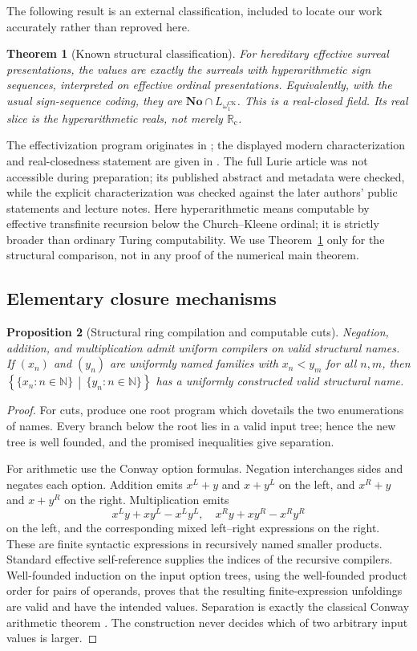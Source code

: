 \documentclass[11pt,letterpaper]{article}
\numberwithin{equation}{section}
\newtheorem{theorem}{Theorem}[section]
\newtheorem{proposition}[theorem]{Proposition}
\theoremstyle{definition}
\theoremstyle{remark}
\newcommand{\No}{\mathbf{No}}
\newcommand{\Rc}{\mathbb R_{\mathrm c}}
\newcommand{\N}{\mathbb N}
\newcommand{\cut}[2]{\left\{#1\,\middle|\,#2\right\}}
\newcommand{\CK}{\omega_1^{\mathrm{CK}}}
\begin{document}
The following result is an external classification, included to locate our
work accurately rather than reproved here.

\begin{theorem}[Known structural classification]
\label{thm:known}
For hereditary effective surreal presentations, the values are exactly the
surreals with hyperarithmetic sign sequences, interpreted on effective
ordinal presentations. Equivalently, with the usual sign-sequence coding,
they are $\No\cap L_{\CK}$. This is a real-closed field. Its real slice is
the hyperarithmetic reals, not merely $\Rc$.
\end{theorem}

The effectivization program originates in
\cite{harkleroad,lurie}; the displayed modern characterization and
real-closedness statement are given in \cite{hamkins,hamkins2025,turetsky}.
The full Lurie article was not accessible during preparation; its published
abstract and metadata were checked, while the explicit characterization
was checked against the later authors' public statements and lecture notes.
Here hyperarithmetic means computable by effective transfinite recursion
below the Church--Kleene ordinal; it is strictly broader than ordinary
Turing computability. We use Theorem~\ref{thm:known} only for the structural
comparison, not in any proof of the numerical main theorem.

\subsection{Elementary closure mechanisms}

\begin{proposition}[Structural ring compilation and computable cuts]
\label{prop:structring}
Negation, addition, and multiplication admit uniform compilers on valid
structural names. If $(x_n)$ and $(y_n)$ are uniformly named families with
$x_n<y_m$ for all $n,m$, then $\cut{\{x_n:n\in\N\}}{\{y_n:n\in\N\}}$
has a uniformly constructed valid structural name.
\end{proposition}
\begin{proof}
For cuts, produce one root program which dovetails the two enumerations of
names. Every branch below the root lies in a valid input tree; hence the
new tree is well founded, and the promised inequalities give separation.

For arithmetic use the Conway option formulas. Negation interchanges sides
and negates each option. Addition emits $x^L+y$ and $x+y^L$ on the left,
and $x^R+y$ and $x+y^R$ on the right. Multiplication emits
\[
 x^Ly+xy^L-x^Ly^L,\quad x^Ry+xy^R-x^Ry^R
\]
on the left, and the corresponding mixed left--right expressions on the
right. These are finite syntactic expressions in recursively named smaller
products. Standard effective self-reference supplies the indices of the
recursive compilers. Well-founded induction on the input option trees,
using the well-founded product order for pairs of operands, proves that the
resulting finite-expression unfoldings are valid and have the intended
values. Separation is exactly the classical Conway arithmetic theorem
\cite{conway}. The construction never decides which of two arbitrary input
values is larger.
\end{proof}
\end{document}
